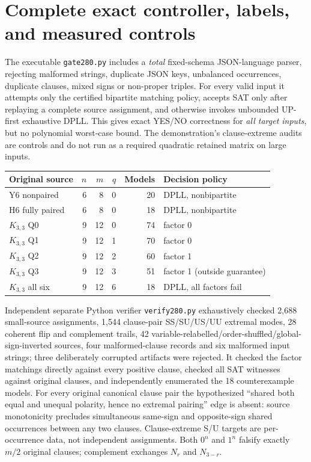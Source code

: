 \documentclass[11pt]{article}
\begin{document}
\section{Complete exact controller, labels, and measured controls}
The executable \texttt{gate280.py} includes a \emph{total} fixed-schema JSON-language parser, rejecting malformed strings, duplicate JSON keys, unbalanced occurrences, duplicate clauses, mixed signs or non-proper triples. For every valid input it attempts only the certified bipartite matching policy, accepts SAT only after replaying a complete source assignment, and otherwise invokes unbounded UP-first exhaustive DPLL. This gives exact YES/NO correctness for \emph{all target inputs}, but no polynomial worst-case bound. The demonstration's clause-extreme audits are controls and do not run as a required quadratic retained matrix on large inputs.

\begin{center}\begin{tabular}{lrrrrl}\toprule
Original source&$n$&$m$&$q$&Models&Decision policy\\\midrule
Y6 nonpaired&6&8&0&20&DPLL, nonbipartite\\
H6 fully paired&6&8&0&18&DPLL, nonbipartite\\
$K_{3,3}$ Q0&9&12&0&74&factor 0\\
$K_{3,3}$ Q1&9&12&1&70&factor 0\\
$K_{3,3}$ Q2&9&12&2&60&factor 1\\
$K_{3,3}$ Q3&9&12&3&51&factor 1 (outside guarantee)\\
$K_{3,3}$ all six&9&12&6&18&DPLL, all factors fail\\\bottomrule
\end{tabular}\end{center}

\noindent Independent separate Python verifier \texttt{verify280.py} exhaustively checked 2,688 small-source assignments, 1,544 clause-pair SS/SU/US/UU extremal modes, 28 coherent flip and complement trails, 42 variable-relabelled/order-shuffled/global-sign-inverted sources, four malformed-clause records and six malformed input strings; three deliberately corrupted artifacts were rejected. It checked the factor matchings directly against every positive clause, checked all SAT witnesses against original clauses, and independently enumerated the 18 counterexample models. For every original canonical clause pair the hypothesized ``shared both equal and unequal polarity, hence no extremal pairing'' edge is absent: source monotonicity precludes simultaneous same-sign and opposite-sign shared occurrences between any two clauses. Clause-extreme S/U targets are per-occurrence data, not independent assignments. Both $0^n$ and $1^n$ falsify exactly $m/2$ original clauses; complement exchanges $N_r$ and $N_{3-r}$.
\end{document}
